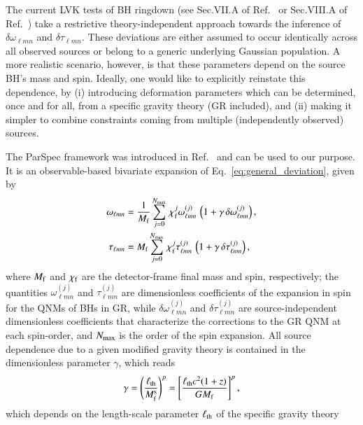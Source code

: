\documentclass[twocolumn,
               prd,
               aps,
               superscriptaddress,
               tightenlines,
               nofootinbib,
               eqsecnum,
               amsfonts,
               amsmath,
               longbibliography]{revtex4-1}
\begin{document}
The current LVK tests of BH ringdown (see Sec.VII.A
of Ref.~\cite{LIGOScientific:2020tif} or Sec.VIII.A
of Ref.~\cite{LIGOScientific:2021sio}) take a restrictive theory-independent
approach towards the inference of $\delta\omega_{\ell m n}$ and
$\delta\tau_{\ell m n}$. These deviations are either assumed to occur
identically across all observed sources or belong to a generic
underlying Gaussian population. A more realistic scenario, however, is
that these parameters depend on the source BH's mass and spin.
%
Ideally, one would like to explicitly reinstate this dependence, by
%
(i) introducing deformation parameters which can be determined, once and for
all, from a specific gravity theory (GR included), and
%
(ii) making it simpler to combine constraints coming from multiple (independently observed) sources.

The ParSpec framework was introduced in Ref.~\cite{Maselli:2019mjd} and can be
used to our purpose. It is an observable-based bivariate expansion of
Eq.~\eqref{eq:general_deviation}, given by
%
\begin{subequations}
\label{eq:kerr_expansion}
\begin{align}
\omega_{\ell m n} &= \frac{1}{M_{\rm f}} \sum_{j = 0}^{N_{\rm max}} \, \chi_{\rm f}^{j} \omega^{(j)}_{\ell m n} \, \left( 1 + \gamma\, \delta \omega^{(j)}_{\ell m n} \right), \\
\tau_{\ell m n}   &= M_{\rm f}     \sum_{j = 0}^{N_{\rm max}} \, \chi_{\rm f}^{j} \tau^{(j)}_{\ell m n}   \, \left( 1 + \gamma\, \delta \tau^{(j)}_{\ell m n} \right),
\end{align}
\end{subequations}
%
where $M_{\rm f}$ and $\chi_{\rm f}$ are the detector-frame final mass and spin, respectively;
the quantities $\omega_{\ell m n}^{(j)}$ and $\tau_{\ell m n}^{(j)}$ are dimensionless coefficients of the
expansion in spin for the QNMs of BHs in GR, while $\delta\omega_{\ell m n}^{(j)}$ and $\delta\tau_{\ell m n}^{(j)}$ are
source-independent dimensionless coefficients that characterize the corrections to the GR QNM at
each spin-order,
%
and $N_{\rm max}$ is the order of the spin expansion.
%
All source dependence due to a given modified gravity theory is contained in the
dimensionless parameter $\gamma$, which reads
%
\begin{equation}
\gamma
%
= \left(\frac{\ell_{\rm th}}{M^{\rm s}_{\rm f}}\right)^{p}
%
= \left[
\frac{\ell_{\rm th} c^2 (1 + z)}{G M_{\rm f}}
\right]^{p},
\label{eq:def_gamma}
\end{equation}
%
which depends on the length-scale parameter $\ell_{\rm th}$ of the specific gravity theory
\end{document}

